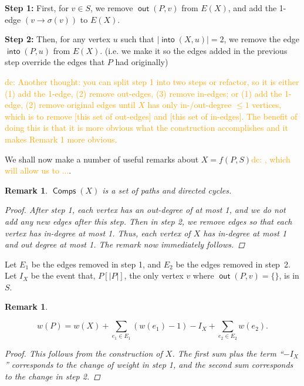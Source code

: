\documentclass{article}
\newtheorem{rmk}[result]{Remark}
\theoremstyle{definition}
\DeclareMathOperator{\out}{\bm{\mathsf{out}}}
\DeclareMathOperator{\into}{\bm{\mathsf{into}}}
\DeclareMathOperator{\Comp}{\bm{\mathsf{Comps}}}
\newcommand{\dc}[1]{\textcolor{orange}{dc: #1}}
\begin{document}
\textbf{Step 1:} First, for $v \in S$, we remove $\out(P,v)$ from $E(X)$, and add the 1-edge $(v \to \sigma(v))$ to $E(X)$. 

\textbf{Step 2:} Then, for any vertex $u$ such that $|\into(X,u)| = 2$, we remove the edge $\into(P,u)$ from $E(X)$. (i.e. we make it so the edges added in the previous step override the edges that $P$ had originally)

\dc{Another thought: you can split step 1 into two steps or refactor, so it is either (1) add the 1-edge, (2) remove out-edges, (3) remove in-edges; or (1) add the 1-edge, (2) remove original edges until $X$ has only in-/out-degree $\le1$ vertices, which is to remove [this set of out-edges] and [this set of in-edges]. The benefit of doing this is that it is more obvious what the construction accomplishes and it makes Remark 1 more obvious.}

\vspace{1.75em}

We shall now make a number of useful remarks about $X=f(P,S)$\dc{, which will allow us to ...}.

\vspace{1.75em}

\begin{rmk} \label{degree rule} $\Comp(X)$ is a set of paths and directed cycles.
\begin{proof}
After step 1, each vertex has an out-degree of at most 1, and we do not add any new edges after this step. Then in step 2, we remove edges so that each vertex has in-degree at most 1. Thus, each vertex of $X$ has in-degree at most 1 and out degree at most 1. The remark now immediately follows.
\end{proof}
\end{rmk}

\vspace{1.75em}

Let $E_1$ be the edges removed in step 1, and $E_2$ be the edges removed in step~2. Let $I_X$ be the event that, $P[|P|]$, the only vertex $v$ where $\out(P,v) = \{\}$, is in $S$.

\begin{rmk}\label{eqq}

\[w(P) = w(X) + \sum_{e_1 \in E_1} (w(e_1)-1)-I_X + \sum_{e_2 \in E_2} w(e_2).\]

\begin{proof}
This follows from the construction of $X$. The first sum plus the term ``$-I_X$'' corresponds to the change of weight in step 1, and the second sum corresponds to the change in step 2.
\end{proof}

\end{rmk}
\end{document}
